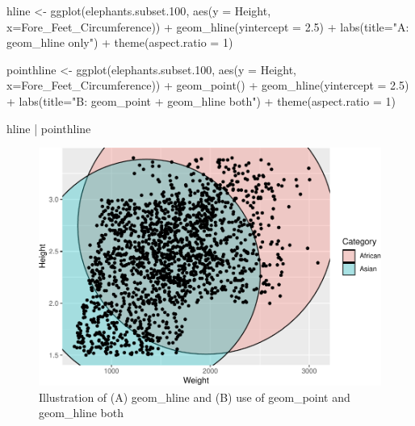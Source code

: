 \documentclass[
]{book}
\newenvironment{Shaded}{\begin{snugshade}}{\end{snugshade}}
\newcommand{\AttributeTok}[1]{\textcolor[rgb]{0.77,0.63,0.00}{#1}}
\newcommand{\DecValTok}[1]{\textcolor[rgb]{0.00,0.00,0.81}{#1}}
\newcommand{\FloatTok}[1]{\textcolor[rgb]{0.00,0.00,0.81}{#1}}
\newcommand{\FunctionTok}[1]{\textcolor[rgb]{0.00,0.00,0.00}{#1}}
\newcommand{\NormalTok}[1]{#1}
\newcommand{\OtherTok}[1]{\textcolor[rgb]{0.56,0.35,0.01}{#1}}
\newcommand{\SpecialCharTok}[1]{\textcolor[rgb]{0.00,0.00,0.00}{#1}}
\newcommand{\StringTok}[1]{\textcolor[rgb]{0.31,0.60,0.02}{#1}}
\begin{document}
\begin{Shaded}
\begin{Highlighting}[]
\NormalTok{hline }\OtherTok{\textless{}{-}} \FunctionTok{ggplot}\NormalTok{(elephants.subset}\FloatTok{.100}\NormalTok{, }\FunctionTok{aes}\NormalTok{(}\AttributeTok{y =}\NormalTok{ Height, }\AttributeTok{x=}\NormalTok{Fore\_Feet\_Circumference)) }\SpecialCharTok{+} \FunctionTok{geom\_hline}\NormalTok{(}\AttributeTok{yintercept =} \FloatTok{2.5}\NormalTok{) }\SpecialCharTok{+} 
  \FunctionTok{labs}\NormalTok{(}\AttributeTok{title=}\StringTok{"A: \textasciigrave{}geom\_hline\textasciigrave{} only"}\NormalTok{) }\SpecialCharTok{+}
  \FunctionTok{theme}\NormalTok{(}\AttributeTok{aspect.ratio =} \DecValTok{1}\NormalTok{)}

\NormalTok{pointhline }\OtherTok{\textless{}{-}} \FunctionTok{ggplot}\NormalTok{(elephants.subset}\FloatTok{.100}\NormalTok{, }\FunctionTok{aes}\NormalTok{(}\AttributeTok{y =}\NormalTok{ Height, }\AttributeTok{x=}\NormalTok{Fore\_Feet\_Circumference)) }\SpecialCharTok{+} 
  \FunctionTok{geom\_point}\NormalTok{() }\SpecialCharTok{+} 
  \FunctionTok{geom\_hline}\NormalTok{(}\AttributeTok{yintercept =} \FloatTok{2.5}\NormalTok{) }\SpecialCharTok{+} 
  \FunctionTok{labs}\NormalTok{(}\AttributeTok{title=}\StringTok{"B: \textasciigrave{}geom\_point + geom\_hline\textasciigrave{} both"}\NormalTok{) }\SpecialCharTok{+}
  \FunctionTok{theme}\NormalTok{(}\AttributeTok{aspect.ratio =} \DecValTok{1}\NormalTok{)}


\NormalTok{hline }\SpecialCharTok{|}\NormalTok{ pointhline}
\end{Highlighting}
\end{Shaded}

\begin{figure}
\centering
\includegraphics{Data-Visualisation-geom-Encyclopedia_files/figure-latex/unnamed-chunk-44-1.pdf}
\caption{\label{fig:unnamed-chunk-44}Illustration of (A) geom\_hline and (B) use of geom\_point and geom\_hline both}
\end{figure}
\end{document}
